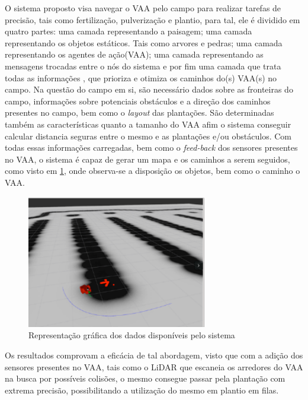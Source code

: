 O sistema proposto visa navegar o VAA pelo campo para realizar tarefas de precisão, tais como fertilização, pulverização e plantio, para tal, ele é dividido em quatro partes: uma camada representando a paisagem; uma camada representando os objetos estáticos. Tais como arvores e pedras; uma camada representando os agentes de ação(VAA); uma camada representando as mensagens trocadas entre o nós do sistema e por fim uma camada que trata todas as informações , que prioriza e otimiza os caminhos do(s) VAA(s) no campo. Na questão do campo em si, são necessário dados sobre as fronteiras do campo, informações sobre potenciais obstáculos e a direção dos caminhos presentes no campo, bem como o \textit{layout} das plantações. São determinadas também as características quanto a tamanho do VAA afim o sistema conseguir calcular distancia seguras entre o mesmo e as plantações e/ou obstáculos. Com todas essas informações carregadas, bem como o \textit{feed-back} dos sensores presentes no VAA, o sistema é capaz de gerar um mapa e os caminhos a serem seguidos, como visto em \ref{fig:caminho-objetos-scheduling}, onde observa-se a disposição os objetos, bem como o caminho o VAA. 
\begin{figure}[H]
    \centering
    \includegraphics[width=0.7\textwidth]{figuras/caminho-objetos-scheduling.png}
    \caption{Representação gráfica dos dados disponíveis pelo sistema}
    \label{fig:caminho-objetos-scheduling}
\end{figure}
Os resultados comprovam a eficácia de tal abordagem, visto que com a adição dos sensores presentes no VAA, tais como o LiDAR que escaneia os arredores do VAA na busca por possíveis colisões, o mesmo consegue passar pela plantação com extrema precisão, possibilitando a utilização do mesmo em plantio em filas.
